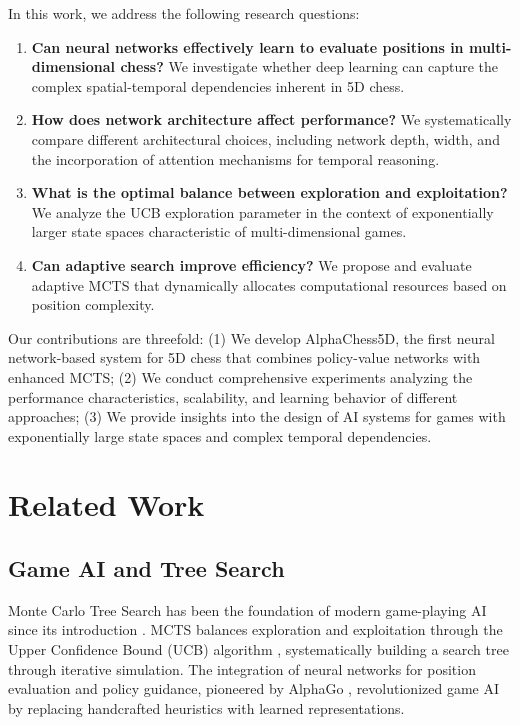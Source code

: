 \documentclass{article}
\begin{document}
In this work, we address the following research questions:

\begin{enumerate}
    \item \textbf{Can neural networks effectively learn to evaluate positions in multi-dimensional chess?} We investigate whether deep learning can capture the complex spatial-temporal dependencies inherent in 5D chess.

    \item \textbf{How does network architecture affect performance?} We systematically compare different architectural choices, including network depth, width, and the incorporation of attention mechanisms for temporal reasoning.

    \item \textbf{What is the optimal balance between exploration and exploitation?} We analyze the UCB exploration parameter in the context of exponentially larger state spaces characteristic of multi-dimensional games.

    \item \textbf{Can adaptive search improve efficiency?} We propose and evaluate adaptive MCTS that dynamically allocates computational resources based on position complexity.
\end{enumerate}

Our contributions are threefold: (1) We develop AlphaChess5D, the first neural network-based system for 5D chess that combines policy-value networks with enhanced MCTS; (2) We conduct comprehensive experiments analyzing the performance characteristics, scalability, and learning behavior of different approaches; (3) We provide insights into the design of AI systems for games with exponentially large state spaces and complex temporal dependencies.

\section{Related Work}

\subsection{Game AI and Tree Search}

Monte Carlo Tree Search has been the foundation of modern game-playing AI since its introduction \cite{coulom2006efficient}. MCTS balances exploration and exploitation through the Upper Confidence Bound (UCB) algorithm \cite{kocsis2006bandit}, systematically building a search tree through iterative simulation. The integration of neural networks for position evaluation and policy guidance, pioneered by AlphaGo \cite{silver2016mastering}, revolutionized game AI by replacing handcrafted heuristics with learned representations.
\end{document}
